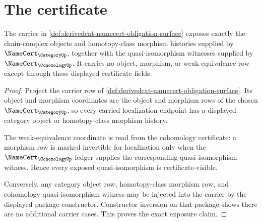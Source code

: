 \section{The certificate}
\label{sec:derivedcat-certificate}

\begin{theorem}
\label{thm:derivedcat-localization-carrier-obligation}
The carrier in \autoref{def:derivedcat-namecert-obligation-surface} exposes exactly the chain-complex objects and homotopy-class morphism histories supplied by $\NameCert_{\CategoryUp}$, together with the quasi-isomorphism witnesses supplied by $\NameCert_{\CohomologyUp}$. It carries no object, morphism, or weak-equivalence row except through these displayed certificate fields.
\end{theorem}
\begin{proof}
Project the carrier row of \autoref{def:derivedcat-namecert-obligation-surface}. Its object and morphism coordinates are the object and morphism rows of the chosen $\NameCert_{\CategoryUp}$, so every carried localization endpoint has a displayed category object or homotopy-class morphism history.

The weak-equivalence coordinate is read from the cohomology certificate: a morphism row is marked invertible for localization only when the $\NameCert_{\CohomologyUp}$ ledger supplies the corresponding quasi-isomorphism witness. Hence every exposed quasi-isomorphism is certificate-visible.

Conversely, any category object row, homotopy-class morphism row, and cohomology quasi-isomorphism witness may be injected into the carrier by the displayed package constructor. Constructor inversion on that package shows there are no additional carrier cases. This proves the exact exposure claim.
\end{proof}

